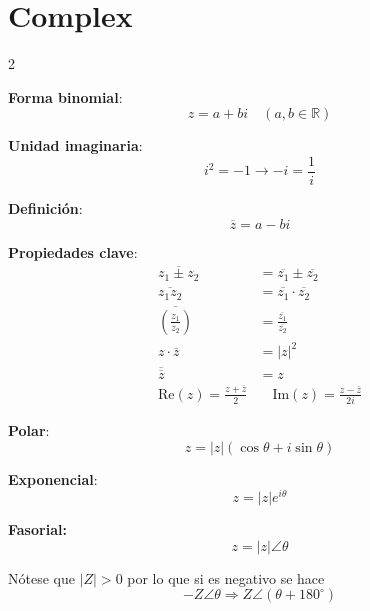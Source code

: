             \section{Complex}
            \begin{multicols}{2}

              \begin{itemform}[leftmargin=*]
                \item \textbf{Forma binomial}:
                  $$ z = a + bi \quad (a,b \in \mathbb{R})$$
                \item \textbf{Unidad imaginaria}:
                  $$ i^2 = -1 \rightarrow -i=\dfrac{1}{i}$$
              \end{itemform}

              \begin{itemform}[leftmargin=*]
                \item \textbf{Definición}:
                  $$ \overline{z} = a - bi $$
                \item \textbf{Propiedades clave}:
                  \begin{align*}
                    \overline{z_1 \pm z_2} &= \overline{z_1} \pm \overline{z_2} \\
                    \overline{z_1 z_2} &= \overline{z_1} \cdot \overline{z_2} \\
                    \overline{\left(\frac{z_1}{z_2}\right)} &= \frac{\overline{z_1}}{\overline{z_2}} \\
                    z \cdot \overline{z} &= |z|^2 \\
                    \overline{\overline{z}} &= z \\
                    \text{Re}(z) = \frac{z + \overline{z}}{2} &\quad
                    \text{Im}(z) = \frac{z - \overline{z}}{2i}
                  \end{align*}
              \end{itemform}

              \begin{itemform}[leftmargin=*]
                \item \textbf{Polar}:
                  $$ z = |z|(\cos\theta + i\sin\theta) $$
                \item \textbf{Exponencial}:
                  $$ z = |z|e^{i\theta} $$
                \item \textbf{Fasorial:}
                $$z=|z| \angle \theta$$
              \end{itemform}
    Nótese que $|Z|>0$ por lo que si es negativo se hace $$-Z\angle \theta \Rightarrow Z\angle (\theta + 180^{\circ})$$
              \columnbreak


\end{multicols}
